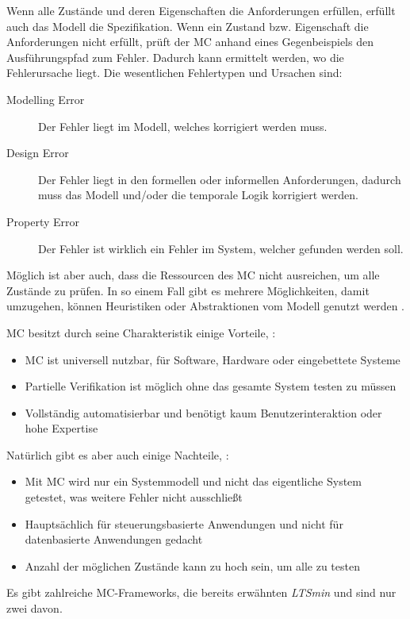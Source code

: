 Wenn alle Zustände und deren Eigenschaften die Anforderungen erfüllen, erfüllt auch das Modell die Spezifikation. Wenn ein Zustand bzw. Eigenschaft die Anforderungen nicht erfüllt, prüft der MC anhand eines Gegenbeispiels den Ausführungspfad zum Fehler. Dadurch kann ermittelt werden, wo die Fehlerursache liegt. Die wesentlichen Fehlertypen und Ursachen sind:

\begin{description}
	\item[Modelling Error] Der Fehler liegt im Modell, welches korrigiert werden muss.
	\item[Design Error] Der Fehler liegt in den formellen oder informellen Anforderungen, dadurch muss das Modell und/oder die temporale Logik korrigiert werden.
	\item[Property Error] Der Fehler ist wirklich ein Fehler im System, welcher gefunden werden soll.
\end{description}

Möglich ist aber auch, dass die Ressourcen des MC nicht ausreichen, um alle Zustände zu prüfen. In so einem Fall gibt es mehrere Möglichkeiten, damit umzugehen, \zB können Heuristiken oder Abstraktionen vom Modell genutzt werden \cite{Baier2008,Eberhardinger2016}.

MC besitzt durch seine Charakteristik einige Vorteile, \uA \cite{Baier2008}:
\begin{itemize}[noitemsep]
	\item MC ist universell nutzbar, \zB für Software, Hardware oder eingebettete Systeme
	\item Partielle Verifikation ist möglich ohne das gesamte System testen zu müssen
	\item Vollständig automatisierbar und benötigt kaum Benutzerinteraktion oder hohe Expertise
\end{itemize}

Natürlich gibt es aber auch einige Nachteile, \uA \cite{Baier2008}:
\begin{itemize}[noitemsep]
	\item Mit MC wird nur ein Systemmodell und nicht das eigentliche System getestet, was weitere Fehler nicht ausschließt
	\item Hauptsächlich für steuerungsbasierte Anwendungen und nicht für datenbasierte Anwendungen gedacht
	\item Anzahl der möglichen Zustände kann zu hoch sein, um alle zu testen
\end{itemize}

Es gibt zahlreiche MC-Frameworks, die bereits erwähnten \emph{LTSmin} und \emph{\sS} sind nur zwei davon.